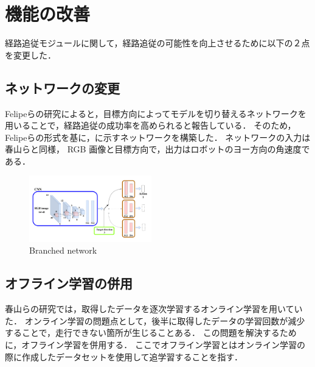 \documentclass[10pt]{jarticle}
\begin{document}
    \section{機能の改善}%
    経路追従モジュールに関して，経路追従の可能性を向上させるために以下の２点を変更した．
    \subsection{ネットワークの変更}
    Felipeらの研究\cite{Codevilla2018}によると，目標方向によってモデルを切り替えるネットワークを用いることで，経路追従の成功率を高められると報告している．
    そのため，Felipeらの形式を基に，に示すネットワークを構築した．
    ネットワークの入力は春山らと同様， RGB 画像と目標方向で，出力はロボットのヨー方向の角速度である．
    \vspace{-1zh}
    \begin{center}
        \begin{figure}[h]
            \includegraphics[width=0.475\textwidth]{./fig/ishiguro/branched.pdf}
            \vspace{-2zh}
            \caption{Branched network}
            \label{fig:branched}
        \end{figure}
    \end{center}
    \vspace{-3zh}

    \subsection{オフライン学習の併用}
    春山らの研究では，取得したデータを逐次学習するオンライン学習を用いていた．
    オンライン学習の問題点として，後半に取得したデータの学習回数が減少することで，走行できない箇所が生じることある．
    この問題を解決するために，オフライン学習を併用する．
    ここでオフライン学習とはオンライン学習の際に作成したデータセットを使用して追学習することを指す．
\end{document}
